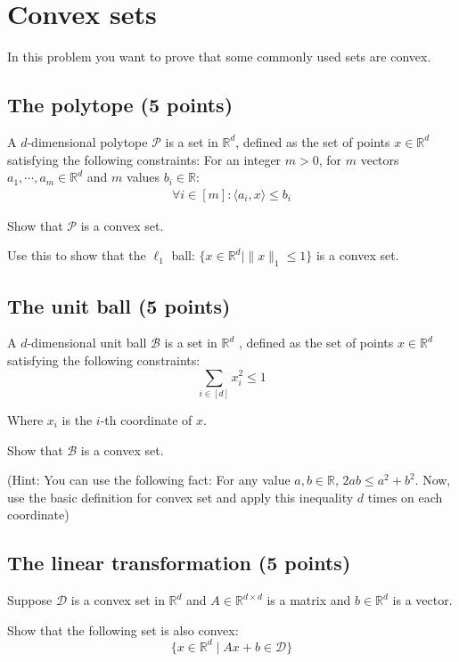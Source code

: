 \section{Convex sets}
In this problem you want to prove that some commonly used sets are convex. 

\subsection{The polytope (5 points)} 

A $d$-dimensional polytope $\mathcal{P}$ is a set in $\mathbb{R}^d$, defined as the set of points $x \in \mathbb{R}^d$  satisfying the following constraints:  For an integer $m > 0$, for $m$ vectors $a_1, \cdots, a_m \in \mathbb{R}^d$ and $m$ values $b_i \in \mathbb{R}$: 
\begin{align}
\forall i \in [m ]: \langle a_i , x \rangle \leq b_i
\end{align}


Show that $\mathcal{P}$ is a convex set. 

Use this to show that the $\ell_1$ ball: $\{ x \in \mathbb{R}^d \mid \| x \|_1 \leq 1\}$ is a convex set.

\subsection{The unit ball (5 points)} \label{sec:problem123}
A $d$-dimensional unit ball $\mathcal{B}$ is a set in $\mathbb{R}^d$ , defined as the set of points  $x \in \mathbb{R}^d$  satisfying the following constraints: 
$$\sum_{i \in [d]} x_i^2 \leq 1$$

Where $x_i$ is the $i$-th coordinate of $x$. 

Show that $\mathcal{B}$ is a convex set. 


(Hint: You can use the following fact: For any value $a, b \in \mathbb{R}$, $2ab \leq a^2 + b^2$. Now, use the basic definition for convex set and apply this inequality $d$ times on each coordinate) 

\subsection{The linear transformation (5 points)}

Suppose $\mathcal{D}$ is a convex set in $\mathbb{R}^d$ and $A \in \mathbb{R}^{d \times d}$ is a matrix and $b \in \mathbb{R}^d$ is a vector.

Show that the following set is also convex:
$$\{ x \in \mathbb{R}^d \mid A x + b \in \mathcal{D} \}$$

